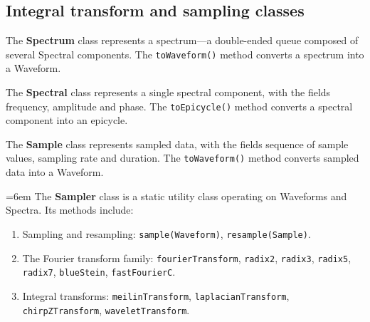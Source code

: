 \subsection{Integral transform and sampling classes}

\begin{definition}\label{def:spectrum_class}
The \textbf{Spectrum} class represents a spectrum---a double-ended queue composed of several Spectral components. The \texttt{toWaveform()} method converts a spectrum into a Waveform.
\end{definition}

\begin{definition}\label{def:spectral_class}
The \textbf{Spectral} class represents a single spectral component, with the fields frequency, amplitude and phase. The \texttt{toEpicycle()} method converts a spectral component into an epicycle.
\end{definition}

\begin{definition}\label{def:sample_class}
The \textbf{Sample} class represents sampled data, with the fields sequence of sample values, sampling rate and duration. The \texttt{toWaveform()} method converts sampled data into a Waveform.
\end{definition}

\begin{definition}\label{def:sampler_class}
\emergencystretch=6em
The \textbf{Sampler} class is a static utility class operating on Waveforms and Spectra. Its methods include:
\begin{enumerate}[label=(\roman*)]
\rightskip=0pt plus1fil\relax
    \item Sampling and resampling: \texttt{sample(Waveform)}, \texttt{resample(Sample)}.
    \item The Fourier transform family: \texttt{fourierTransform}, \texttt{radix2}, \texttt{radix3}, \texttt{radix5}, \texttt{radix7}, \texttt{blueStein}, \texttt{fastFourierC}.
    \item Integral transforms: \texttt{meilinTransform}, \texttt{laplacianTransform}, \texttt{chirpZTransform}, \texttt{waveletTransform}.
\end{enumerate}
\end{definition}


